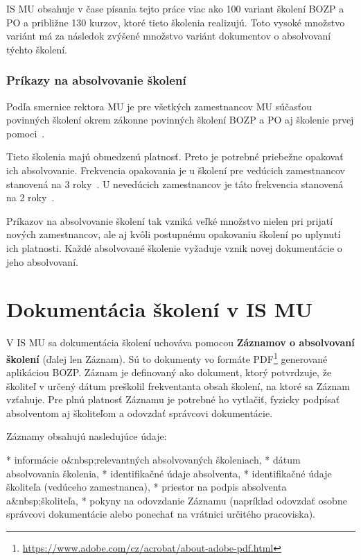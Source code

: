 \documentclass[
  digital,     %
  oneside,     %
  nosansbold,  %
  nocolorbold, %
  lof,         %
  nolot,         %
]{fithesis4}
\begin{document}
IS MU obsahuje v čase písania tejto práce viac ako 100 variant školení BOZP a PO a približne 130 kurzov, ktoré tieto školenia realizujú. Toto vysoké množstvo variánt má za následok zvýšené množstvo variánt dokumentov o absolvovaní týchto školení.

\subsection*{Príkazy na absolvovanie školení}
Podľa smernice rektora MU je pre všetkých zamestnancov MU súčasťou povinných školení okrem zákonne povinných školení BOZP a PO aj školenie prvej pomoci~\cites[sekcia~3.2.1,~bod~3.]{smernice_rektora_bozp}.

Tieto školenia majú obmedzenú platnosť. Preto je potrebné priebežne opakovať ich absolvovanie. Frekvencia opakovania je u školení pre vedúcich zamestnancov stanovená na 3 roky~\cites[sekcia~3.2.4,~bod~b)]{smernice_rektora_bozp}[čl.~4,~odst.~2~bod~c)]{smernice_mu_po}. U nevedúcich zamestnancov je táto frekvencia stanovená na 2 roky~\cites[sekcia~3.2.2,~bod~1.]{smernice_rektora_bozp}[čl.~10,~odst.~2]{smernice_mu_po}.

Príkazov na absolvovanie školení tak vzniká veľké množstvo nielen pri prijatí nových zamestnancov, ale aj kvôli postupnému opakovaniu školení po uplynutí ich platnosti. Každé absolvované školenie vyžaduje vznik novej dokumentácie o jeho absolvovaní.

\chapter{Dokumentácia školení v IS MU}
\label{kap-3}
V IS MU sa dokumentácia školení uchováva pomocou \textbf{Záznamov o absolvovaní školení} (ďalej len Záznam). Sú to dokumenty vo formáte PDF\footnote{\url{https://www.adobe.com/cz/acrobat/about-adobe-pdf.html}} generované aplikáciou BOZP. Záznam je definovaný ako dokument, ktorý potvrdzuje, že školiteľ v určený dátum preškolil frekventanta obsah školení, na ktoré sa Záznam vzťahuje. Pre plnú platnosť Záznamu je potrebné ho vytlačiť, fyzicky podpísať absolventom aj školiteľom a odovzdať správcovi dokumentácie.

Záznamy obsahujú nasledujúce údaje:

\begin{markdown}
  * informácie o&nbsp;relevantných absolvovaných školeniach,
  * dátum absolvovania školenia,
  * identifikačné údaje absolventa,
  * identifikačné údaje školiteľa (vedúceho zamestnanca),
  * priestor na podpis absolventa a&nbsp;školiteľa,
  * pokyny na odovzdanie Záznamu (napríklad odovzdať osobne správcovi dokumentácie alebo ponechať na vrátnici určitého pracoviska).
\end{markdown}
\end{document}
